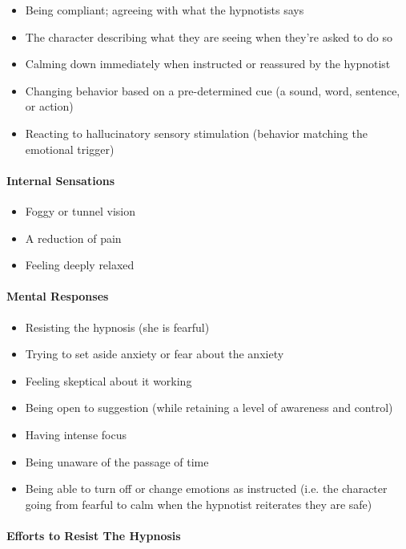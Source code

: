 \begin{itemize}
    \item Being compliant; agreeing with what the hypnotists says
    \item The character describing what they are seeing when they're asked to do so
    \item Calming down immediately when instructed or reassured by the hypnotist
    \item Changing behavior based on a pre-determined cue (a sound, word, sentence, or action)
    \item Reacting to hallucinatory sensory stimulation (behavior matching the emotional trigger)
\end{itemize}

\paragraph{Internal Sensations}

\begin{itemize}
    \item Foggy or tunnel vision
    \item A reduction of pain
    \item Feeling deeply relaxed
\end{itemize}


\paragraph{Mental Responses}

\begin{itemize}
    \item Resisting the hypnosis (she is fearful)
    \item Trying to set aside anxiety or fear about the anxiety
    \item Feeling skeptical about it working
    \item Being open to suggestion (while retaining a level of awareness and control)
    \item Having intense focus
    \item Being unaware of the passage of time
    \item Being able to turn off or change emotions as instructed (i.e. the 
    character going from fearful to calm when the hypnotist reiterates they are safe)
\end{itemize}


\paragraph{Efforts to Resist The Hypnosis}

